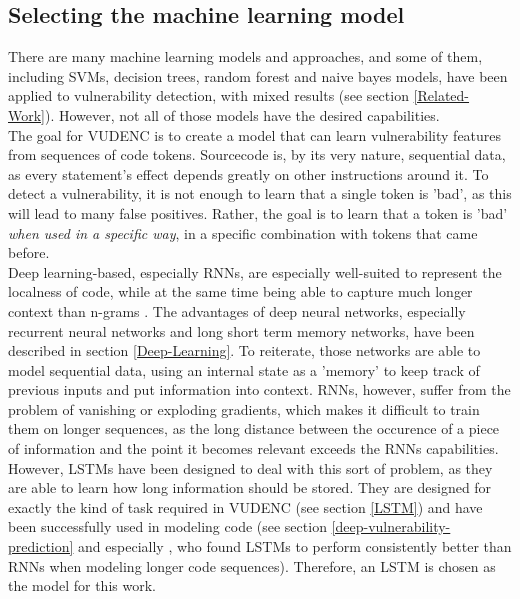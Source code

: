 \documentclass[
	a4paper,
	pagesize,
	pdftex,
	12pt,
	twoside, %
	BCOR=5mm, %
	ngerman,
	fleqn,
	final,
	]{scrartcl}
\begin{document}
\subsection{Selecting the machine learning model}
There are many machine learning models and approaches, and some of them, including SVMs, decision trees, random forest and naive bayes models, have been applied to vulnerability detection, with mixed results (see section \ref{Related-Work}). However, not all of those models have the desired capabilities.\\
The goal for VUDENC is to create a model that can learn vulnerability features from sequences of code tokens. Sourcecode is, by its very nature, sequential data, as every statement's effect depends greatly on other instructions around it. To detect a vulnerability, it is not enough to learn that a single token is 'bad', as this will lead to many false positives. Rather, the goal is to learn that a token is 'bad' \textit{when used in a specific way}, in a specific combination with tokens that came before.\\
Deep learning-based, especially RNNs, are especially well-suited to represent the localness of code, while at the same time being able to capture much longer context than n-grams \cite{Dam.2016}. The advantages of deep neural networks, especially recurrent neural networks and long short term memory networks, have been described in section \ref{Deep-Learning}. To reiterate, those networks are able to model sequential data, using an internal state as a 'memory' to keep track of previous inputs and put information into context. RNNs, however, suffer from the problem of vanishing or exploding gradients, which makes it difficult to train them on longer sequences, as the long distance between the occurence of a piece of information and the point it becomes relevant exceeds the RNNs capabilities. However, LSTMs have been designed to deal with this sort of problem, as they are able to learn how long information should be stored. They are designed for exactly the kind of task required in VUDENC (see section \ref{LSTM}) and have been successfully used in modeling code (see section \ref{deep-vulnerability-prediction} and especially \cite{Dam.2016}, who found LSTMs to perform consistently better than RNNs when modeling longer code sequences). Therefore, an LSTM is chosen as the model for this work.
\end{document}

